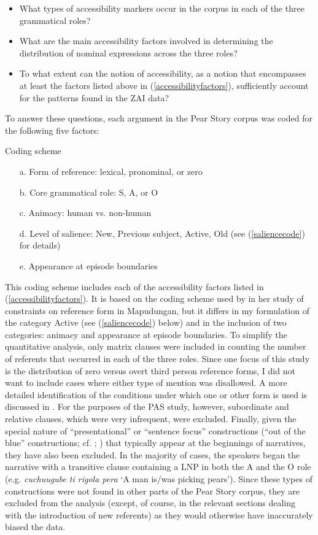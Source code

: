 \begin{itemize}

\item What types of accessibility markers occur in the corpus in each of the three grammatical roles? 
\item What are the main accessibility factors involved in determining the distribution of nominal expressions across the three roles? 
\item To what extent can the notion of accessibility, as a notion that encompasses at least the factors listed above in (\ref{accessibilityfactors}), sufficiently account for the patterns found in the ZAI data?
\end{itemize}
To answer these questions, each argument in the Pear Story corpus was coded for the following five factors:

\ea Coding scheme

\begin{itemize}
\item[a.] Form of reference: lexical, pronominal, or zero
\item[b.] Core grammatical role: S, A, or O
\item[c.] Animacy: human vs. non-human
\item[d.] Level of salience: New, Previous subject, Active, Old (see (\ref{saliencecode}) for details)
\item[e.] Appearance at episode boundaries
\end{itemize}
\z

This coding scheme includes each of the accessibility factors listed in (\ref{accessibilityfactors}). It is based on the coding scheme used by \citet{arnold2003} in her study of constraints on reference form in Mapudungan, but it differs in my formulation of the category Active (see (\ref{saliencecode}) below) and in the inclusion of two categories: animacy and appearance at episode boundaries. To simplify the quantitative analysis, only matrix clauses were included in counting the number of referents that occurred in each of the three roles. Since one focus of this study is the distribution of zero versus overt third person reference forms, I did not want to include cases where either type of mention was disallowed. A more detailed identification of the conditions under which one or other form is used is discussed in . For the purposes of the PAS study, however, subordinate and relative clauses, which were very infrequent, were excluded. Finally, given the special nature of ``presentational'' or ``sentence focus'' constructions (``out of the blue'' constructions; cf. ; ) that typically appear at the beginnings of narratives, they have also been excluded. In the majority of cases, the speakers began the narrative with a transitive clause containing a LNP in both the A and the O role (e.g. \textit{cuchuugube ti rigola pera} `A man is/was picking pears'). Since these types of constructions were not found in other parts of the Pear Story corpus, they are excluded from the analysis (except, of course, in the relevant sections dealing with the introduction of new referents) as they would otherwise have inaccurately biased the data.


